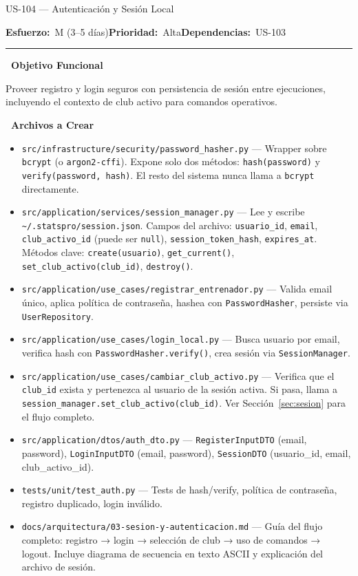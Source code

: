 \documentclass[11pt,a4paper]{article}
\newcommand{\fpath}[1]{\texttt{\small #1}}
\newcommand{\usfield}[2][\;]{%
  \par\vspace{5pt}%
  {\small\textbf{\textcolor{primary}{#2}}}\par\vspace{2pt}%
}
\newcommand{\usmeta}[3]{%
  \vspace{2pt}%
  {\small\textcolor{secondary}{%
    \textbf{Esfuerzo:}~#1\quad\textbf{Prioridad:}~#2\quad\textbf{Dependencias:}~#3%
  }}%
  \par\vspace{4pt}%
  \textcolor{bordergray}{\rule{\linewidth}{0.4pt}}\par\vspace{4pt}%
}
\begin{document}
\begin{uscard}{US-104 — Autenticación y Sesión Local}

\usmeta{M (3–5 días)}{Alta}{US-103}

\usfield{\faAlignLeft\ Objetivo Funcional}
Proveer registro y login seguros con persistencia de sesión entre ejecuciones, incluyendo el contexto de club activo para comandos operativos.

\usfield{\faFolderOpen\ Archivos a Crear}
\begin{itemize}[nosep, leftmargin=1.6em]
  \item \fpath{src/infrastructure/security/password\_hasher.py} — Wrapper sobre \fpath{bcrypt} (o \fpath{argon2-cffi}). Expone solo dos métodos: \fpath{hash(password)} y \fpath{verify(password, hash)}. El resto del sistema nunca llama a \fpath{bcrypt} directamente.
  \item \fpath{src/application/services/session\_manager.py} — Lee y escribe \fpath{\textasciitilde/.statspro/session.json}. Campos del archivo: \fpath{usuario\_id}, \fpath{email}, \fpath{club\_activo\_id} (puede ser \fpath{null}), \fpath{session\_token\_hash}, \fpath{expires\_at}. Métodos clave: \fpath{create(usuario)}, \fpath{get\_current()}, \fpath{set\_club\_activo(club\_id)}, \fpath{destroy()}.
  \item \fpath{src/application/use\_cases/registrar\_entrenador.py} — Valida email único, aplica política de contraseña, hashea con \fpath{PasswordHasher}, persiste via \fpath{UserRepository}.
  \item \fpath{src/application/use\_cases/login\_local.py} — Busca usuario por email, verifica hash con \fpath{PasswordHasher.verify()}, crea sesión via \fpath{SessionManager}.
  \item \fpath{src/application/use\_cases/cambiar\_club\_activo.py} — Verifica que el \fpath{club\_id} exista y pertenezca al usuario de la sesión activa. Si pasa, llama a \fpath{session\_manager.set\_club\_activo(club\_id)}. Ver Sección~\ref{sec:sesion} para el flujo completo.
  \item \fpath{src/application/dtos/auth\_dto.py} — \fpath{RegisterInputDTO} (email, password), \fpath{LoginInputDTO} (email, password), \fpath{SessionDTO} (usuario\_id, email, club\_activo\_id).
  \item \fpath{tests/unit/test\_auth.py} — Tests de hash/verify, política de contraseña, registro duplicado, login inválido.
  \item \fpath{docs/arquitectura/03-sesion-y-autenticacion.md} — Guía del flujo completo: registro → login → selección de club → uso de comandos → logout. Incluye diagrama de secuencia en texto ASCII y explicación del archivo de sesión.
\end{itemize}


\end{uscard}
\end{document}
